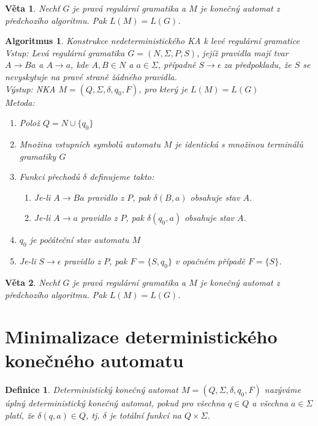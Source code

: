 \documentclass[a4paper, 11pt]{report}
\newtheorem{mydef}{Definice}[chapter]
\newtheorem{veta}{Věta}[chapter]
\newtheorem{alg}{Algoritmus}[chapter]
\begin{document}
\begin{veta}
Nechť $G$ je pravá regulární gramatika a $M$ je konečný automat z předchozího algoritmu. Pak $L(M) = L(G)$.
\end{veta}

\begin{alg}
Konstrukce nedeterministického KA k levé regulární gramatice \\
Vstup: Levá regulární gramatika  $G = (N, \Sigma, P, S)$, jejíž pravidla mají tvar $A \to Ba$ a $A \to a$, kde $A,B \in N$ a $a \in \Sigma$, případně $S \to \epsilon$ za předpokladu, že $S$ se nevyskytuje na pravé straně žádného pravidla.\\
Výstup: NKA $M = (Q, \Sigma, \delta, q_0, F)$, pro který je $L(M) = L(G)$\\
Metoda:
\begin{enumerate}
	\item Polož $Q = N \cup \{q_0\}$
	\item Množina vstupních symbolů automatu $M$ je identická s množinou terminálů gramatiky $G$
	\item Funkci přechodů $\delta$ definujeme takto:
	\begin{enumerate}
		\item Je-li $A \to Ba$ pravidlo z $P$, pak $\delta(B, a)$ obsahuje stav $A$.
		\item Je-li $A \to a$ pravidlo z $P$, pak $\delta(q_0, a)$ obsahuje stav $A$.
	\end{enumerate}
	\item $q_0$ je počáteční stav automatu $M$
	\item Je-li $S \to \epsilon$ pravidlo z $P$, pak $F = \{S, q_0\}$ v opačném případě $F = \{S\}$.
\end{enumerate}
\end{alg}

\begin{veta}
Nechť $G$ je pravá regulární gramatika a $M$ je konečný automat z předchozího algoritmu. Pak $L(M) = L(G)$.
\end{veta}

\section{Minimalizace deterministického konečného automatu}

\begin{mydef}
Deterministický konečný automat $M = (Q, \Sigma, \delta, q_0, F)$ nazýváme \emph{úplný deterministický konečný automat}, pokud pro všechna $q \in Q$ a všechna $a \in \Sigma$ platí, že $\delta(q, a) \in Q$, tj. $\delta$ je totální funkcí na $Q \times \Sigma$.
\end{mydef}
\end{document}
